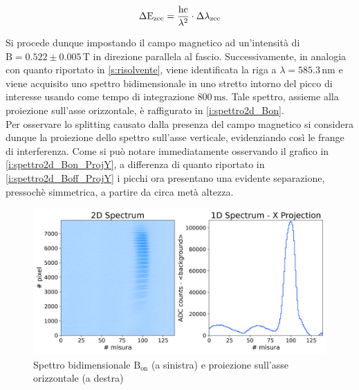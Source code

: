 \documentclass[twocolumn,10pt]{asme2ej}
\begin{document}
\vspace{-15pt}
\begin{equation}
    \Delta \text{E}_{\text{zee}} = \frac{\text{hc}}{\lambda^2} \cdot \Delta\lambda_{\text{zee}}
    \label{e:dEzee}
\vspace{-5pt}
\end{equation}

Si procede dunque impostando il campo magnetico ad un'intensità di $\text{B} = 0.522 \pm 0.005 \,\si{\tesla}$ in
direzione parallela al fascio. Successivamente, in analogia con quanto riportato in \autoref{s:risolvente}, viene
identificata la riga a $\lambda = 585.3 \,\si{\nano\metre}$ e viene acquisito uno spettro bidimensionale in uno stretto
intorno del picco di interesse usando come tempo di integrazione $800\,\si{\milli\second}$. Tale spettro, assieme alla
proiezione sull'asse orizzontale, è raffigurato in \autoref{i:spettro2d_Bon}. \\
Per osservare lo splitting causato dalla presenza del campo magnetico si considera dunque la proiezione dello spettro
sull'asse verticale, evidenziando così le frange di interferenza. Come si può notare immediatamente osservando il
grafico in \autoref{i:spettro2d_Bon_ProjY}, a differenza di quanto riportato in \autoref{i:spettro2d_Boff_ProjY} i
picchi ora presentano una evidente separazione, pressochè simmetrica, a partire da circa metà altezza. 

\begin{figure}
    \centering
    \includegraphics[width=\linewidth]{../Plots/Bon_2d_spectrum.png}
    \caption{Spettro bidimensionale $\text{B}_{\text{on}}$ (a sinistra) e proiezione sull'asse orizzontale (a destra)}
    \label{i:spettro2d_Bon}
\end{figure}
\end{document}
